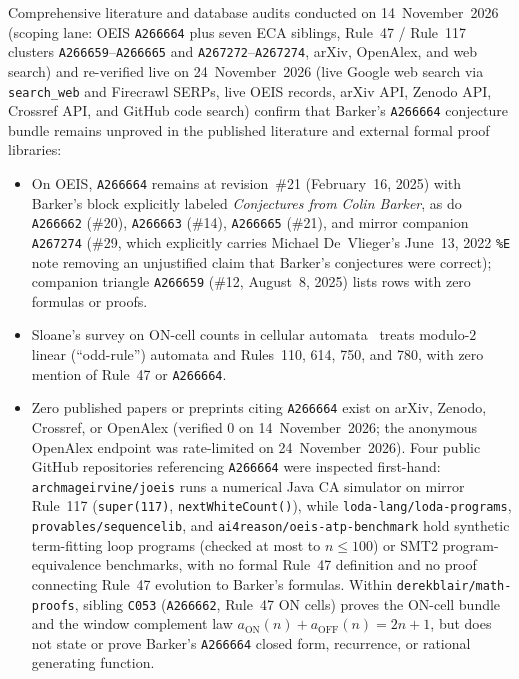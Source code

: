 \documentclass[11pt]{article}
\theoremstyle{definition}
\newcommand{\seq}[1]{\texttt{#1}}
\begin{document}
Comprehensive literature and database audits conducted on 14~November~2026 (scoping lane: OEIS \seq{A266664} plus seven ECA siblings, Rule~47 / Rule~117 clusters \seq{A266659}--\seq{A266665} and \seq{A267272}--\seq{A267274}, arXiv, OpenAlex, and web search) and re-verified live on 24~November~2026 (live Google web search via \texttt{search\_web} and Firecrawl SERPs, live OEIS records, arXiv API, Zenodo API, Crossref API, and GitHub code search) confirm that Barker's \seq{A266664} conjecture bundle remains unproved in the published literature and external formal proof libraries:
\begin{itemize}
\item On OEIS, \seq{A266664} remains at revision~\#21 (February~16, 2025) with Barker's block explicitly labeled \emph{Conjectures from Colin Barker}, as do \seq{A266662} (\#20), \seq{A266663} (\#14), \seq{A266665} (\#21), and mirror companion \seq{A267274} (\#29, which explicitly carries Michael De~Vlieger's June~13, 2022 \texttt{\%E} note removing an unjustified claim that Barker's conjectures were correct); companion triangle \seq{A266659} (\#12, August~8, 2025) lists rows with zero formulas or proofs.
\item Sloane's survey on ON-cell counts in cellular automata~\cite{sloane2015} treats modulo-$2$ linear (``odd-rule'') automata and Rules~110, 614, 750, and 780, with zero mention of Rule~47 or \seq{A266664}.
\item Zero published papers or preprints citing \seq{A266664} exist on arXiv, Zenodo, Crossref, or OpenAlex (verified $0$ on 14~November~2026; the anonymous OpenAlex endpoint was rate-limited on 24~November~2026). Four public GitHub repositories referencing \seq{A266664} were inspected first-hand: \texttt{archmageirvine/joeis} runs a numerical Java CA simulator on mirror Rule~117 (\texttt{super(117)}, \texttt{nextWhiteCount()}), while \texttt{loda-lang/loda-programs}, \texttt{provables/sequencelib}, and \texttt{ai4reason/oeis-atp-benchmark} hold synthetic term-fitting loop programs (checked at most to $n \le 100$) or SMT2 program-equivalence benchmarks, with no formal Rule~47 definition and no proof connecting Rule~47 evolution to Barker's formulas. Within \texttt{derekblair/math-proofs}, sibling \texttt{C053} (\seq{A266662}, Rule~47 ON cells) proves the ON-cell bundle and the window complement law $a_{\mathrm{ON}}(n) + a_{\mathrm{OFF}}(n) = 2n + 1$, but does not state or prove Barker's \seq{A266664} closed form, recurrence, or rational generating function.
\end{itemize}
\end{document}
